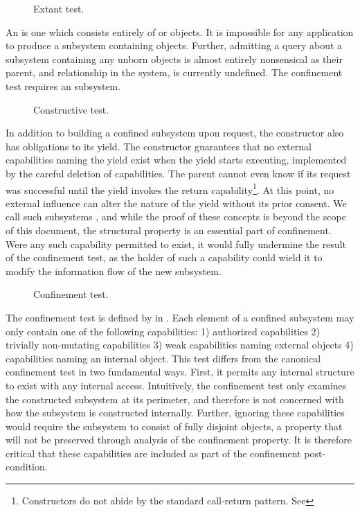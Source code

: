 \begin{figure}
  \COQDOCextantTest
  \caption{Extant test. \label{fig:confinement:extantTest}}
\end{figure}

An  is one which consists entirely of \TMalive{} or \TMdead{} objects.
It is impossible for any application to produce a subsystem containing \COQunborn{} objects.
Further, admitting a query about a subsystem containing any unborn objects is almost entirely nonsensical as their parent, and relationship in the system, is currently undefined.
The confinement test requires an \TMextant{} subsystem.

\begin{figure}
  \COQDOCautonomousTest{}
  \caption{Constructive test. \label{fig:confinement:autonomousTest}}
\end{figure}

In addition to building a confined subsystem upon request, the constructor also has obligations to its yield.
The constructor guarantees that no external capabilities naming the yield exist when the yield starts executing, implemented by the careful deletion of capabilities.
The parent cannot even know if its request was successful until the yield invokes the return capability\footnote{Constructors do not abide by the standard call-return pattern.  See }.
At this point, no external influence can alter the nature of the yield without its prior consent.
We call such subsystems \term{\TMautonomous{}}, and while the proof of these concepts is beyond the scope of this document, the structural property is an essential part of confinement.
Were any such capability permitted to exist, it would fully undermine the result of the confinement test, as the holder of such a capability could wield it to modify the information flow of the new subsystem.

\begin{figure}
  \COQDOCconfinementPred{}
  \COQDOCconfinementTest{}
  \caption{Confinement test. \label{fig:confinement:confinementTest}}
\end{figure}

The confinement test is defined by \COQconfinementTest{} in .
Each element of a confined subsystem may only contain one of the following capabilities: 1) authorized capabilities 2) trivially non-mutating capabilities 3) weak capabilities naming external objects 4) capabilities naming an internal object.
This test differs from the canonical confinement test in two fundamental ways.
First, it permits any internal structure to exist with any internal access.
Intuitively, the confinement test only examines the constructed subsystem at its perimeter, and therefore is not concerned with how the subsystem is constructed internally.
Further, ignoring these capabilities would require the subsystem to consist of fully disjoint objects, a property that will not be preserved through analysis of the confinement property.
It is therefore critical that these capabilities are included as part of the confinement post-condition.


